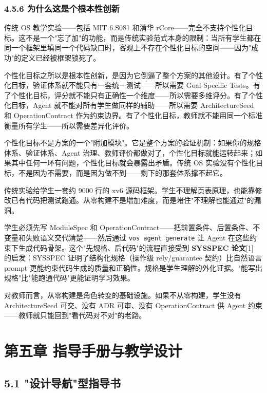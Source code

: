 \documentclass[UTF8,a4paper,12pt,openany]{ctexrep}
\newcommand{\passthrough}[1]{#1}
\begin{document}
\subsection{4.5.6 为什么这是个根本性创新}\label{456-ux4e3aux4ec0ux4e48ux8fd9ux662fux4e2aux6839ux672cux6027ux521bux65b0}

传统 OS 教学实验------包括 MIT 6.S081 和清华 rCore------完全不支持个性化目标。这不是一个"忘了加"的功能，而是传统实验范式本身的限制：当所有学生都在同一个框架里填同一个代码缺口时，客观上不存在个性化目标的空间------因为"成功"的定义已经被框架锁死了。

个性化目标之所以是根本性创新，是因为它倒逼了整个方案的其他设计。有了个性化目标，验证体系就不能只有一套统一测试------所以需要 Goal-Specific Tests。有了个性化目标，评分就不能只有正确性一个维度------所以需要多维评分。有了个性化目标，Agent 就不能对所有学生做同样的辅助------所以需要 ArchitectureSeed 和 OperationContract 作为约束边界。有了个性化目标，教师就不能用同一个标准衡量所有学生------所以需要差异化评价。

个性化目标不是方案的一个"附加模块"。它是整个方案的验证机制：如果你的规格体系、验证体系、Agent 治理、教师评价都做对了，个性化目标就能运转起来；如果其中任何一环有问题，个性化目标就会暴露出矛盾。传统 OS 实验没有个性化目标，不是因为不需要，而是因为做不到------剩下的那套体系撑不起它。

传统实验给学生一套约 9000 行的 xv6 源码框架。学生不理解页表原理，也能靠修改已有代码把测试跑通。从零构建不是增加难度，而是堵住"不理解也能通过"的漏洞。

学生必须先写 ModuleSpec 和 OperationContract------把前置条件、后置条件、不变量和失败语义交代清楚------然后通过 \passthrough{\lstinline!vos agent generate!} 让 Agent 在这些约束下生成代码骨架。这个"先规格、后代码"的流程直接受到 \textbf{SYSSPEC 论文}{[}1{]} 的启发：SYSSPEC 证明了结构化规格（操作级 rely/guarantee 契约）比自然语言 prompt 更能约束代码生成的质量和正确性。规格是学生理解的外化证据。"能写出规格"比"能跑通代码"更能证明学习效果。

对教师而言，从零构建是角色转变的基础设施。如果不从零构建，学生没有 ArchitectureSeed 可交、没有 ADR 可审、没有 OperationContract 供 Agent 约束------教师就只能回到"看代码对不对"的老路。


\chapter{第五章 指导手册与教学设计}\label{ux7b2cux4e94ux7ae0-ux6307ux5bfcux624bux518cux4e0eux6559ux5b66ux8bbeux8ba1}

\section{5.1 "设计导航"型指导书}\label{51-ux8bbeux8ba1ux5bfcux822aux578bux6307ux5bfcux4e66}
\end{document}
